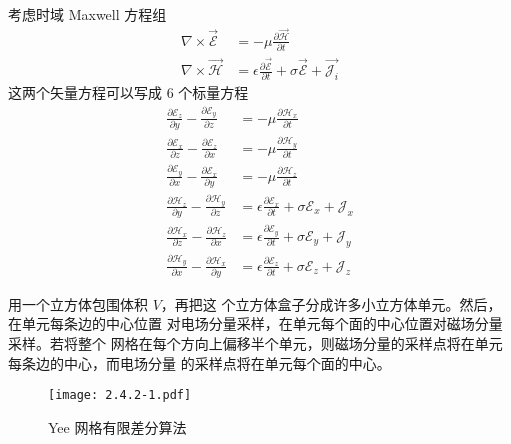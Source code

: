 \begin{theorem}
    考虑时域 Maxwell 方程组
    \begin{align}
        \nabla \times \vec{\mathscr{E}} &= -\mu \frac{\partial \vec{\mathscr{H}}}{\partial t}\\
        \nabla \times \vec{\mathscr{H}} &= 
        \epsilon \frac{\partial \vec{\mathscr{E}}}{\partial t}
        +\sigma \vec{\mathscr{E}}
        +\vec{\mathscr{J}_i}
    \end{align}
    这两个矢量方程可以写成 6 个标量方程
    \begin{align}
        \frac{\partial \mathscr{E}_z}{\partial y}
        -\frac{\partial \mathscr{E}_y}{\partial z}
        &= -\mu \frac{\partial \mathscr{H}_x}{\partial t}\\
        \frac{\partial \mathscr{E}_x}{\partial z}
        -\frac{\partial \mathscr{E}_z}{\partial x}
        &= -\mu \frac{\partial \mathscr{H}_y}{\partial t}\\
        \frac{\partial \mathscr{E}_y}{\partial x}
        -\frac{\partial \mathscr{E}_x}{\partial y}
        &= -\mu \frac{\partial \mathscr{H}_z}{\partial t}\\
        \frac{\partial \mathscr{H}_z}{\partial y}
        -\frac{\partial \mathscr{H}_y}{\partial z}
        &= \epsilon \frac{\partial \mathscr{E}_x}{\partial t}
        +\sigma \mathscr{E}_x + \mathscr{J}_x\\
        \frac{\partial \mathscr{H}_x}{\partial z}
        -\frac{\partial \mathscr{H}_z}{\partial x}
        &= \epsilon \frac{\partial \mathscr{E}_y}{\partial t}
        +\sigma \mathscr{E}_y + \mathscr{J}_y\\
        \frac{\partial \mathscr{H}_y}{\partial x}
        -\frac{\partial \mathscr{H}_x}{\partial y}
        &= \epsilon \frac{\partial \mathscr{E}_z}{\partial t}
        +\sigma \mathscr{E}_z + \mathscr{J}_z
    \end{align}
\end{theorem}

\par 用一个立方体包围体积 $V$，再把这
个立方体盒子分成许多小立方体单元。然后，在单元每条边的中心位置
对电场分量采样，在单元每个面的中心位置对磁场分量采样。若将整个
网格在每个方向上偏移半个单元，则磁场分量的采样点将在单元每条边的中心，而电场分量
的采样点将在单元每个面的中心。

\begin{figure}[!htbp]
    \centering
    \texttt{[image: 2.4.2-1.pdf]}
    \caption{Yee 网格有限差分算法}
\end{figure}

